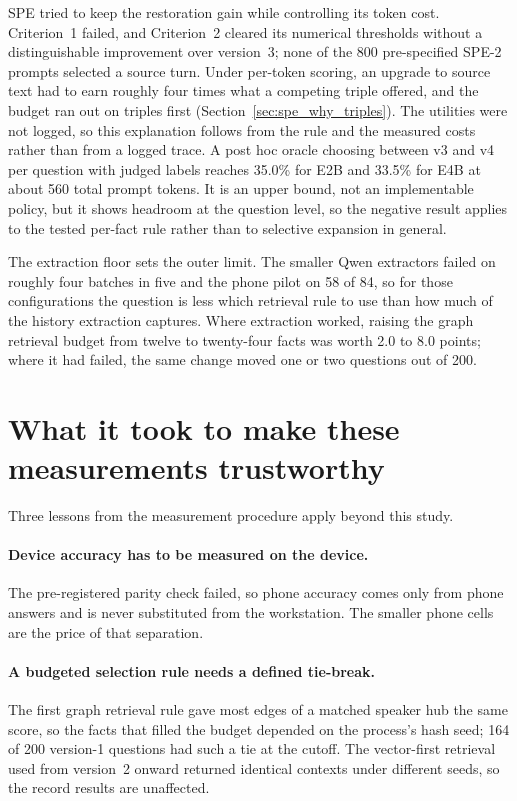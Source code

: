 SPE tried to keep the restoration gain while controlling its token cost. Criterion~1 failed, and
Criterion~2 cleared its numerical thresholds without a distinguishable improvement over version~3;
none of the 800 pre-specified SPE-2 prompts selected a source turn. Under per-token scoring, an
upgrade to source text had to earn roughly four times what a competing triple offered, and the
budget ran out on triples first (Section~\ref{sec:spe_why_triples}). The utilities were not logged,
so this explanation follows from the rule and the measured costs rather than from a logged trace. A post hoc
oracle choosing between v3 and v4 per question with judged labels reaches 35.0\% for E2B and 33.5\%
for E4B at about 560 total prompt tokens. It is an upper bound, not an implementable policy, but it
shows headroom at the question level, so the negative result applies to the tested per-fact rule
rather than to selective expansion in general.

The extraction floor sets the outer limit. The smaller Qwen extractors failed on roughly four batches
in five and the phone pilot on 58 of 84, so for those configurations the question is less which
retrieval rule to use than how much of the history extraction captures. Where extraction worked,
raising the graph retrieval budget from twelve to twenty-four facts was worth 2.0 to 8.0 points;
where it had failed, the same change moved one or two questions out of 200.

\section{What it took to make these measurements trustworthy}
\label{sec:ch9_method}

Three lessons from the measurement procedure apply beyond this study.

\paragraph{Device accuracy has to be measured on the device.}
The pre-registered parity check failed, so phone accuracy comes only from phone answers and is never
substituted from the workstation. The smaller phone cells are the price of that separation.

\paragraph{A budgeted selection rule needs a defined tie-break.}
The first graph retrieval rule gave most edges of a matched speaker hub the same score, so the facts
that filled the budget depended on the process's hash seed; 164 of 200 version-1 questions had such a
tie at the cutoff. The vector-first retrieval used from version~2 onward returned identical contexts
under different seeds, so the record results are unaffected.


